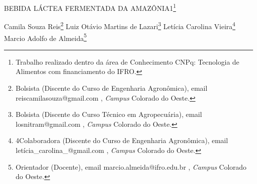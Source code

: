 \documentclass[article,12pt,onesidea,4paper,english,brazil]{abntex2}
\begin{document}
	
	
	\frenchspacing 
	
	\begin{center}
		\LARGE BEBIDA LÁCTEA FERMENTADA DA AMAZÔNIA1\footnote{Trabalho realizado dentro da área de Conhecimento CNPq: Tecnologia de Alimentos com financiamento do IFRO.}
		
		\normalsize
		Camila Souza Reis\footnote{Bolsista (Discente do Curso de Engenharia Agronômica), email reiscamilasouza@gmail.com , \textit{Campus} Colorado do Oeste.} 
		Luiz Otávio Martins de Lazari\footnote{Bolsista (Discente do Curso Técnico em Agropecuária), email losnitram@gmail.com , \textit{Campus} Colorado do Oeste.} 
		Letícia Carolina Vieira\footnote{4Colaboradora (Discente do Curso de Engenharia Agronômica), email letícia\_carolina\_@gmail.com , \textit{Campus} Colorado do Oeste.} 
		Marcio Adolfo de Almeida\footnote{Orientador (Docente), email marcio.almeida@ifro.edu.br , \textit{Campus} Colorado do Oeste.} 
	\end{center}
	
\end{document}
